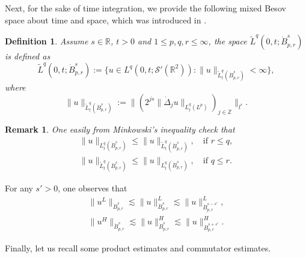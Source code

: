 \documentclass[10pt,a4paper]{amsart}
\numberwithin{equation}{section}
\newtheorem{definition}[theorem]{Definition}
\newtheorem{remark}[theorem]{Remark}
\begin{document}
Next, for the sake of time integration, we provide the following mixed Besov space
about time and space, which was introduced in \cite{MR1354312}.

\begin{definition}\label{def2.2} \rm
Assume $s\in\mathbb{R}$, $t>0$ and $1\leqslant p,q,r\leqslant\infty$, the space
$\tilde{L}^q(0,t;\dot{B}^s_{p,r})$ is defined as
\[
 \tilde{L}^q(0,t;\dot{B}^s_{p,r}):=\{u\in L^q(0,t;\mathcal{S}'(\mathbb{R}^2)):\|u\|_{\tilde{L}^q_t(\dot{B}^s_{p,r})}<\infty\},
\]
 where
\[
 \|u\|_{\tilde{L}^q_t(\dot{B}^s_{p,r})}:=\|(2^{js}\|\dot{\Delta}_ju\|_{L^q_t(L^p)})_{j\in\mathbb{Z}}\|_{l^r}.
\]
\end{definition}

\begin{remark}\label{rem2.1} \rm
One easily from Minkowski's inequality check that
 \begin{equation} \label{2.5}
 \begin{gathered}
 \|u\|_{{L}^q_t(\dot{B}^s_{p,r})}\leqslant\|u\|_{\tilde{L}^q_t(\dot{B}^s_{p,r})},
 \quad\text{if }r\leqslant q,\\
 \|u\|_{\tilde{L}^q_t(\dot{B}^s_{p,r})}\leqslant\|u\|_{{L}^q_t(\dot{B}^s_{p,r})},
 \quad\text{if }q\leqslant r.
 \end{gathered}
 \end{equation}
\end{remark}

For any $s'>0$, one observes that
\begin{equation} \label{2.6}
 \begin{gathered}
 \|u^L\|_{\dot{B}^s_{p,r}}\lesssim\|u\|^L_{\dot{B}^s_{p,r}}\lesssim\|u\|^L_{\dot{B}^{s-s'}_{p,r}},\\
 \|u^H\|_{\dot{B}^s_{p,r}}\lesssim\|u\|^H_{\dot{B}^s_{p,r}}\lesssim\|u\|^H_{\dot{B}^{s+s'}_{p,r}}.
 \end{gathered}
\end{equation}

Finally, let us recall some product estimates and commutator estimates.
\end{document}

